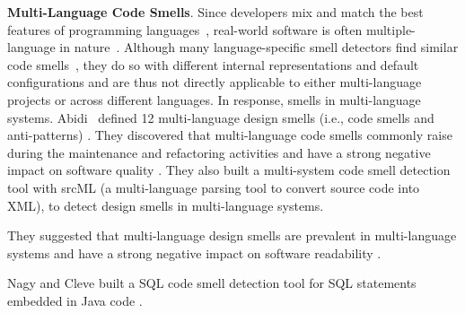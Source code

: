 





{\bf Multi-Language Code Smells}.
%
Since developers mix and match the best features of programming
languages~\cite{7476675}, real-world software is often multiple-language in
nature~\cite{723183}.
%
Although many language-specific smell detectors find similar code
smells~\cite{PMD,CheckStyle,Pysmell,Jscent,DesigniteJava}, they do so with
different internal representations and default configurations and are thus not
directly applicable to either multi-language projects or across different
languages.
%
In response, smells in multi-language systems. Abidi~\etal{} defined 12
multi-language design smells (i.e., code smells and anti-patterns)
\cite{MultiLanguageCodeSmells}. They discovered that multi-language code smells
commonly raise during the maintenance and refactoring activities and have a
strong negative impact on software quality \cite{Abidi2}. They also built a
multi-system code smell detection tool with srcML (a multi-language parsing tool
to convert source code into XML), to detect design smells in multi-language
systems.

They suggested that multi-language design smells are prevalent in
multi-language systems and have a strong negative impact on software
readability \cite{Fault-Prone}.

Nagy and Cleve built a SQL code smell detection tool for SQL statements
embedded in Java code \cite{SQLInJava}.
